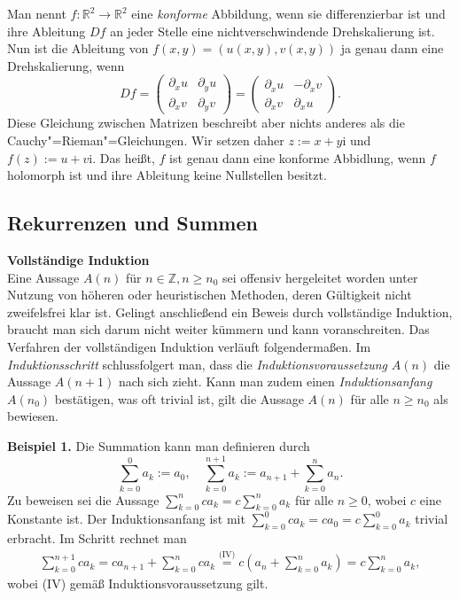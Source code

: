 \documentclass[paper=180mm:225mm,pagesize=auto,fleqn,twoside,11pt,dvipdfmx]{scrartcl}
\theoremstyle{rmbox}
\newenvironment{Rezept}[1]{\strong{#1}\\}{}
\newcommand{\strong}[1]{\textsf{\textbf{#1}}}
\newcommand{\ui}{\mathrm{i}}
\newcommand{\Z}{\mathbb Z}
\newcommand{\R}{\mathbb R}
\begin{document}
Man nennt $f\colon\R^2\to\R^2$ eine \emph{konforme} Abbildung, wenn sie
differenzierbar ist und ihre Ableitung $Df$ an jeder Stelle
eine nichtverschwindende Drehskalierung ist. Nun ist die
Ableitung von $f(x,y)=(u(x,y),v(x,y))$ ja genau dann eine
Drehskalierung, wenn
\[Df = \begin{pmatrix}
\partial_x u & \partial_y u\\
\partial_x v & \partial_y v
\end{pmatrix} = \begin{pmatrix}
\partial_x u & -\partial_x v\\
\partial_x v & \partial_x u
\end{pmatrix}.\]
Diese Gleichung zwischen Matrizen beschreibt aber nichts anderes als
die Cauchy"=Rieman"=Gleichungen. Wir setzen daher $z:=x+y\ui$ und
$f(z):=u+v\ui$. Das heißt, $f$ ist genau dann eine konforme
Abbidlung, wenn $f$ holomorph ist und ihre Ableitung keine
Nullstellen besitzt.

\subsection{Rekurrenzen und Summen}

\begin{Rezept}{Vollständige Induktion}
Eine Aussage $A(n)$ für $n\in\Z, n\ge n_0$ sei offensiv
hergeleitet worden unter Nutzung von höheren oder
heuristischen Methoden, deren Gültigkeit nicht zweifelsfrei
klar ist. Gelingt anschließend ein Beweis durch vollständige
Induktion, braucht man sich darum nicht weiter kümmern
und kann voranschreiten.
\end{Rezept}
Das Verfahren der vollständigen Induktion verläuft folgendermaßen.
Im \emph{Induktionsschritt} schlussfolgert man, dass die
\emph{Induktionsvoraussetzung} $A(n)$ die Aussage $A(n+1)$ nach sich
zieht. Kann man zudem einen \emph{Induktionsanfang}
$A(n_0)$ bestätigen, was oft trivial ist, gilt die Aussage $A(n)$
für alle $n\ge n_0$ als bewiesen.

\strong{Beispiel 1.} Die Summation kann man definieren durch%
\[\sum_{k=0}^0 a_k := a_0,\quad
\sum_{k=0}^{n+1} a_k := a_{n+1}+\sum_{k=0}^n a_n.
\]
Zu beweisen sei die Aussage $\sum_{k=0}^n ca_k = c\sum_{k=0}^n a_k$
für alle $n\ge 0$, wobei
$c$ eine Konstante ist. Der Induktionsanfang ist mit
$\sum_{k=0}^0 ca_k = ca_0 = c\sum_{k=0}^0 a_k$
trivial erbracht. Im Schritt rechnet man%
\begin{gather*}
\sum_{k=0}^{n+1} ca_k = ca_{n+1}+\sum_{k=0}^n ca_k
\!\!\stackrel{\text{(IV)}}=\! c(a_n + \sum_{k=0}^n a_k)
= c\!\sum_{k=0}^n a_k,
\end{gather*}
wobei (IV) gemäß Induktionsvoraussetzung gilt.
\end{document}
